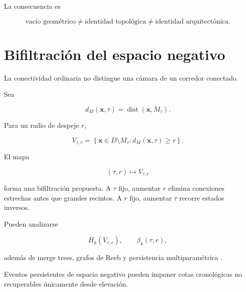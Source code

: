 La consecuencia es

\begin{equation}
\boxed{
\text{vacío geométrico}
\neq
\text{identidad topológica}
\neq
\text{identidad arquitectónica}.
}
\end{equation}

\section{Bifiltración del espacio negativo}

La conectividad ordinaria no distingue una cámara de un corredor conectado.

Sea

\begin{equation}
d_M(\mathbf x,\tau)
=
\operatorname{dist}
(\mathbf x,M_\tau).
\end{equation}

Para un radio de despeje \(r\),

\begin{equation}
\boxed{
V_{\tau,r}
=
\left\{
\mathbf x\in D\setminus M_\tau:
d_M(\mathbf x,\tau)\ge r
\right\}.
}
\end{equation}

El mapa

\begin{equation}
(\tau,r)\mapsto V_{\tau,r}
\end{equation}

forma una bifiltración propuesta. A \(\tau\) fijo, aumentar \(r\) elimina conexiones estrechas antes que grandes recintos. A \(r\) fijo, aumentar \(\tau\) recorre estados inversos.

Pueden analizarse

\begin{equation}
H_k(V_{\tau,r}),
\qquad
\beta_k(\tau,r),
\end{equation}

además de merge trees, grafos de Reeb y persistencia multiparamétrica \cite{edelsbrunner2010,carlsson2009,carlssonzomorodian2009}.

\begin{conjecture}
Eventos persistentes de espacio negativo pueden imponer cotas cronológicas no recuperables únicamente desde elevación.
\end{conjecture}
